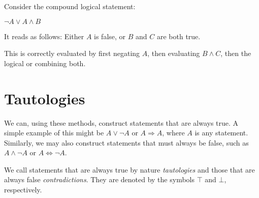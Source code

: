 \begin{example}
  Consider the compound logical statement:\\
  \begin{center}
    \(\neg A \lor A \land B\)
  \end{center}
  It reads as follows: Either \(A\) is false, or \(B\) and \(C\) are both true.

  This is correctly evaluated by first negating \(A\), then evaluating
  \(B \land C\), then the logical or combining both.
\end{example}

\section{Tautologies}

We can, using these methods, construct statements that are always true.
A simple example of this might be \(A \lor \neg A\) or \(A \Rightarrow A\),
where \(A\) is any statement. Similarly, we may also construct statements that
must always be false, such as \(A \land \neg A\) or \(A \Leftrightarrow \neg A\).

We call statements that are always true by nature \emph{tautologies} and
those that are always false \emph{contradictions}. They are denoted by the
symbols \(\top\) and \(\bot\), respectively.


